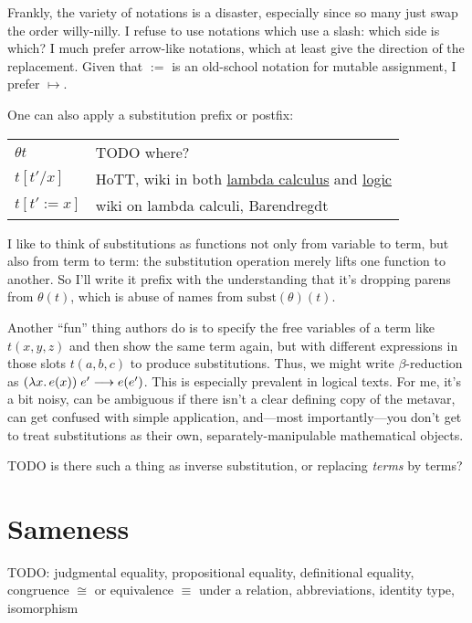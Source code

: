 \documentclass[11pt]{article} %
\theoremstyle{definition}
\theoremstyle{remark}
\begin{document}
Frankly, the variety of notations is a disaster, especially since so many just swap the order willy-nilly.
I refuse to use notations which use a slash: which side is which?
I much prefer arrow-like notations, which at least give the direction of the replacement.
Given that $:=$ is an old-school notation for mutable assignment, I prefer $\mapsto$.

One can also apply a substitution prefix or postfix:
\begin{center}
\renewcommand{\arraystretch}{1.2}
\begin{tabular}{lp{10cm}}
$\theta t$ & TODO where? \\
$t[t'/x]$ & HoTT, wiki in both \href{https://en.wikipedia.org/wiki/Lambda_calculus}{lambda calculus} and \href{https://en.wikipedia.org/wiki/Substitution_(logic)}{logic} \\
$t[t':=x]$ & wiki on lambda calculi, Barendregdt \\
\end{tabular}
\end{center}

I like to think of substitutions as functions not only from variable to term, but also from term to term: the substitution operation merely lifts one function to another. So I'll write it prefix with the understanding that it's dropping parens from $\theta(t)$, which is abuse of names from $\mathrm{subst}(\theta)(t)$.

Another ``fun'' thing authors do is to specify the free variables of a term like $t(x, y, z)$ and then show the same term again, but with different expressions in those slots $t(a, b, c)$ to produce substitutions.
Thus, we might write $\beta$-reduction as $({\lambda}{x}.\,e(x))\;e' \longrightarrow e(e')$.
This is especially prevalent in logical texts.
For me, it's a bit noisy, can be ambiguous if there isn't a clear defining copy of the metavar, can get confused with simple application, and---most importantly---you don't get to treat substitutions as their own, separately-manipulable mathematical objects.

TODO is there such a thing as inverse substitution, or replacing \emph{terms} by terms?

\section{Sameness}

TODO: judgmental equality, propositional equality, definitional equality, congruence $\cong$ or equivalence $\equiv$ under a relation, abbreviations, identity type, isomorphism
\end{document}
